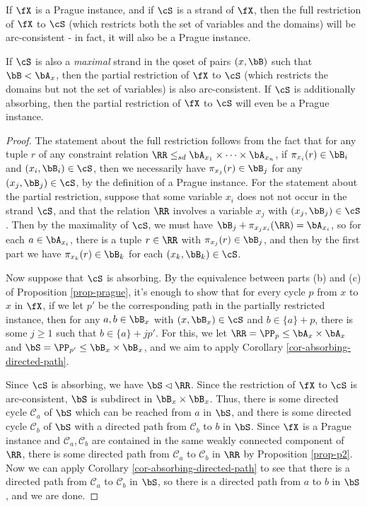 \begin{prop}\label{prop-prague-reduction} If $\fX$ is a Prague instance, and if $\cS$ is a strand of $\fX$, then the full restriction of $\fX$ to $\cS$ (which restricts both the set of variables and the domains) will be arc-consistent - in fact, it will also be a Prague instance.

If $\cS$ is also a \emph{maximal} strand in the qoset of pairs $(x,\bB)$ such that $\bB < \bA_x$, then the partial restriction of $\fX$ to $\cS$ (which restricts the domains but not the set of variables) is also arc-consistent. If $\cS$ is additionally absorbing, then the partial restriction of $\fX$ to $\cS$ will even be a Prague instance.
\end{prop}
\begin{proof} The statement about the full restriction follows from the fact that for any tuple $r$ of any constraint relation $\RR \le_{sd} \bA_{x_1} \times \cdots \times \bA_{x_n}$, if $\pi_{x_i}(r) \in \bB_i$ and $(x_i,\bB_i) \in \cS$, then we necessarily have $\pi_{x_j}(r) \in \bB_j$ for any $(x_j, \bB_j) \in \cS$, by the definition of a Prague instance. For the statement about the partial restriction, suppose that some variable $x_i$ does not not occur in the strand $\cS$, and that the relation $\RR$ involves a variable $x_j$ with $(x_j, \bB_j) \in \cS$. Then by the maximality of $\cS$, we must have $\bB_j + \pi_{x_jx_i}(\RR) = \bA_{x_i}$, so for each $a \in \bA_{x_i}$, there is a tuple $r \in \RR$ with $\pi_{x_j}(r) \in \bB_j$, and then by the first part we have $\pi_{x_k}(r) \in \bB_k$ for each $(x_k, \bB_k) \in \cS$.

Now suppose that $\cS$ is absorbing. By the equivalence between parts (b) and (c) of Proposition \ref{prop-prague}, it's enough to show that for every cycle $p$ from $x$ to $x$ in $\fX$, if we let $p'$ be the corresponding path in the partially restricted instance, then for any $a,b \in \bB_x$ with $(x,\bB_x) \in \cS$ and $b \in \{a\}+p$, there is some $j \ge 1$ such that $b \in \{a\} + jp'$. For this, we let $\RR = \PP_p \le \bA_x\times \bA_x$ and $\bS = \PP_{p'} \le \bB_x \times \bB_x$, and we aim to apply Corollary \ref{cor-absorbing-directed-path}.

Since $\cS$ is absorbing, we have $\bS \lhd \RR$. Since the restriction of $\fX$ to $\cS$ is arc-consistent, $\bS$ is subdirect in $\bB_x \times \bB_x$. Thus, there is some directed cycle $\mathcal{C}_a$ of $\bS$ which can be reached from $a$ in $\bS$, and there is some directed cycle $\mathcal{C}_b$ of $\bS$ with a directed path from $\mathcal{C}_b$ to $b$ in $\bS$. Since $\fX$ is a Prague instance and $\mathcal{C}_a, \mathcal{C}_b$ are contained in the same weakly connected component of $\RR$, there is some directed path from $\mathcal{C}_a$ to $\mathcal{C}_b$ in $\RR$ by Proposition \ref{prop-p2}. Now we can apply Corollary \ref{cor-absorbing-directed-path} to see that there is a directed path from $\mathcal{C}_a$ to $\mathcal{C}_b$ in $\bS$, so there is a directed path from $a$ to $b$ in $\bS$, and we are done.
\end{proof}

